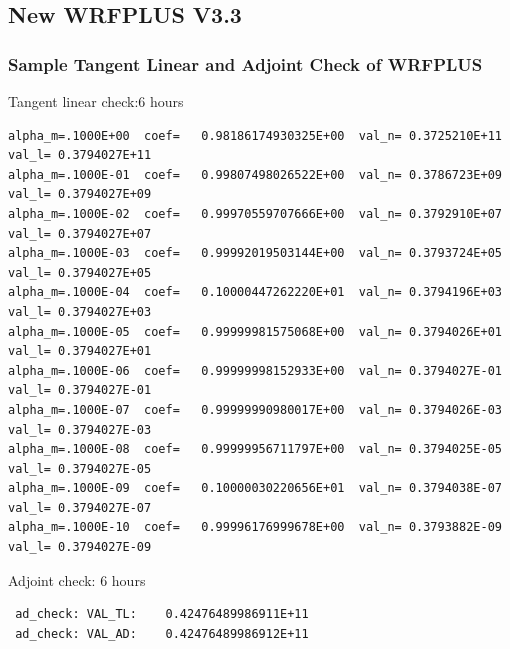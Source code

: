 \documentclass{beamer}
\begin{document}
\subsection{New WRFPLUS V3.3}
\begin{frame}[fragile]
\frametitle{Sample Tangent Linear and Adjoint Check of WRFPLUS }
\begin{beamerboxesrounded}[ lower=postit,shadow=true]{Tangent linear check:6 hours}
{\tiny
\begin{verbatim}
alpha_m=.1000E+00  coef=   0.98186174930325E+00  val_n= 0.3725210E+11  val_l= 0.3794027E+11
alpha_m=.1000E-01  coef=   0.99807498026522E+00  val_n= 0.3786723E+09  val_l= 0.3794027E+09
alpha_m=.1000E-02  coef=   0.99970559707666E+00  val_n= 0.3792910E+07  val_l= 0.3794027E+07
alpha_m=.1000E-03  coef=   0.99992019503144E+00  val_n= 0.3793724E+05  val_l= 0.3794027E+05
alpha_m=.1000E-04  coef=   0.10000447262220E+01  val_n= 0.3794196E+03  val_l= 0.3794027E+03
alpha_m=.1000E-05  coef=   0.99999981575068E+00  val_n= 0.3794026E+01  val_l= 0.3794027E+01
alpha_m=.1000E-06  coef=   0.99999998152933E+00  val_n= 0.3794027E-01  val_l= 0.3794027E-01
alpha_m=.1000E-07  coef=   0.99999990980017E+00  val_n= 0.3794026E-03  val_l= 0.3794027E-03
alpha_m=.1000E-08  coef=   0.99999956711797E+00  val_n= 0.3794025E-05  val_l= 0.3794027E-05
alpha_m=.1000E-09  coef=   0.10000030220656E+01  val_n= 0.3794038E-07  val_l= 0.3794027E-07
alpha_m=.1000E-10  coef=   0.99996176999678E+00  val_n= 0.3793882E-09  val_l= 0.3794027E-09
\end{verbatim}
}
\end{beamerboxesrounded}
\pause
\begin{beamerboxesrounded}[ lower=postit,shadow=true]{Adjoint check: 6 hours}
{\tiny
\begin{verbatim}
 ad_check: VAL_TL:    0.42476489986911E+11
 ad_check: VAL_AD:    0.42476489986912E+11
\end{verbatim}
}
\end{beamerboxesrounded}
\end{frame}
\end{document}
